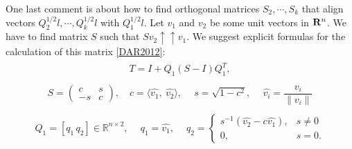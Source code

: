 \documentclass[letterpaper,10pt,english]{sphinxmanual}
\begin{document}
One last comment is about how to find orthogonal matrices
$S_2,\cdots,S_k$ that align vectors
$Q_2^{1/2}l, \cdots, Q_k^{1/2}l$ with $Q_1^{1/2}l$. Let
$v_1$ and $v_2$ be some unit vectors in ${\bf R}^n$.
We have to find matrix $S$ such that
$Sv_2\uparrow\uparrow v_1$.
We suggest explicit formulas for the
calculation of this matrix {\hyperref[chap_ellcalc:dar2012]{{[}DAR2012{]}}}:
\label{chap_ellcalc:equation-valign1}\begin{gather}
\begin{split}T = I + Q_1(S - I)Q_1^T,\end{split}\label{chap_ellcalc-valign1}
\end{gather}\label{chap_ellcalc:equation-valign2}\begin{gather}
\begin{split}S = \begin{pmatrix}
     c & s\\
     -s & c
    \end{pmatrix},\quad c = \langle\hat{v_1},\ \hat{v_2}\rangle,\ \quad s = \sqrt{1 - c^2},\ \quad \hat{v_i} = \dfrac{v_i}{\|v_i\|}\end{split}\label{chap_ellcalc-valign2}
\end{gather}\label{chap_ellcalc:equation-valign3}\begin{gather}
\begin{split}Q_1 = [q_1 \, q_2]\in \mathbb{R}^{n\times2},\ \quad q_1 = \hat{v_1},\ \quad q_2 = \begin{cases}
s^{-1}(\hat{v_2} - c\hat{v_1}),& s\ne 0\\
0,& s = 0.
\end{cases}\end{split}\label{chap_ellcalc-valign3}
\end{gather}
\end{document}
